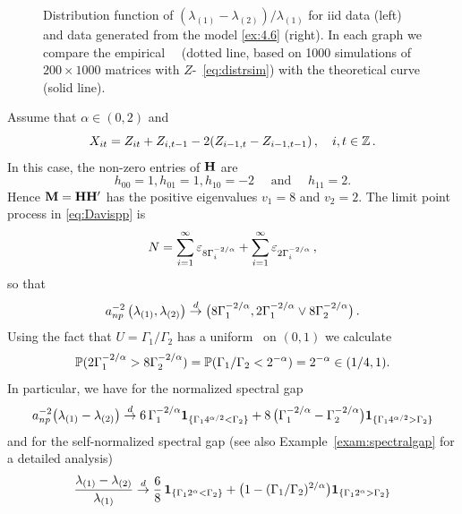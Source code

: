 \begin{example}
\begin{figure}[htb!]
{  }
  \caption{Distribution function of $(\lambda_{(1)} - \lambda_{(2)})/\lambda_{(1)}$ for iid data (left) and
    data generated from the model \eqref{ex:4.6} (right). In each graph we compare the empirical \ds\ \fct\
(dotted line, based on
1000 simulations of $200 \times 1000$ matrices with $Z$-\ds\ \eqref{eq:distrsim}) with the theoretical curve (solid line).}
  \label{fig:ProbMass}
\end{figure}
Assume that $\alpha\in (0,2)$ and
\begin{equation}\label{ex:4.6}
X_{it}= Z_{it}+ Z_{i,t-1}-2 (Z_{i-1,t}- Z_{i-1,t-1})\,,\quad i,t\in\Z\,.
\end{equation}
In this case, the non-zero entries of $\H$ are
\begin{equation*}
h_{00}=1, h_{01}=1,h_{10}=-2 \quad \mbox{ and }\quad h_{11}=2.
\end{equation*}
Hence $\mathbf M=\H\H'$ has the positive eigenvalues
$v_1=8$ and $v_2=2$. The limit point process in \eqref{eq:Davispp} is
\begin{equation*}
N=\sum_{i=1}^\infty \vep_{8\Gamma_i^{-2/\alpha}}+ \sum_{i=1}^\infty \vep_{2\Gamma_i^{-2/\alpha}}\,,
\end{equation*}
so that
\begin{equation*}
a_{np}^{-2}\,\big(\la_{(1)},\la_{(2)}\big) \cid
\big(8\Gamma_{1}^{-2/\alpha}, 2\Gamma_1^{-2/\alpha}\vee 8
\Gamma_2^{-2/\alpha}\big)\,.
\end{equation*}
Using the fact that $U=\Gamma_1/\Gamma_2$ has a uniform \ds\ on $(0,1)$ we calculate
\begin{equation*}
\P(2\Gamma_1^{-2/\alpha}>8\Gamma_2^{-2/\alpha})= \P(\Gamma_1/\Gamma_2<2^{-\alpha})= 2^{-\alpha} \in (1/4,1).
\end{equation*}
In particular, we have for the normalized spectral gap
\begin{equation*}
a_{np}^{-2} \big(\la_{(1)}-\la_{(2)}\big)\cid
6 \,\Gamma_1^{-2/\alpha} \I_{\{\Gamma_1 4^{\alpha/2 }<\Gamma_2\}}+
8\,
\big(\Gamma_1^{-2/\alpha}-\Gamma_2^{-2/\alpha}\big)\I_{\{\Gamma_14^{\alpha/2
  }> \Gamma_2\}}
\end{equation*}
and for the self-normalized spectral gap (see also Example~\ref{exam:spectralgap} for a detailed analysis)
\begin{equation*}
\begin{split}
\dfrac{\la_{(1)}-\la_{(2)}}{\la_{(1)}}&\cid
\dfrac{6}{8} \, \I_{\{\Gamma_1 2^{\alpha }<\Gamma_2\}}+
\big(1-(\Gamma_1/\Gamma_2)^{2/\alpha}\big)\I_{\{\Gamma_12^{\alpha
  }> \Gamma_2\}}\\

\end{split}
\end{equation*}
\end{example}
